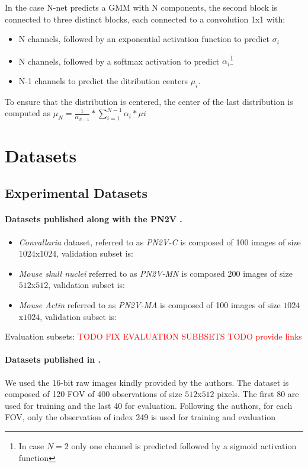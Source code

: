 \documentclass{article}
\begin{document}
In the case N-net predicts a GMM with N components, the second block is connected to three distinct blocks, each connected to a convolution 1x1 with:
\begin{itemize}
  \item N channels, followed by an exponential activation function to predict $\sigma_{i}$
  \item N channels, followed by a softmax activation to predict $\alpha_{i}$\footnote{In case $N=2$ only one channel is predicted followed by a sigmoid activation function}
  \item N-1 channels to predict the ditribution centers $\mu_{i}$.
\end{itemize}
To ensure that the distribution is centered, the center of the last distribution is computed as $\mu_{N} = \frac{1}{\alpha_{N-1}} * \sum_{i=1}^{N-1}{\alpha_{i} * \mu{i}}$

\section{Datasets}
\subsection{Experimental Datasets}
\label{si:datasetxp}
\paragraph{Datasets published along with the PN2V \cite{krull2019probabilistic}.}
\begin{itemize}
  \item \emph{Convallaria} dataset, referred to as \emph{PN2V-C} is composed of 100 images of size $1024$x$1024$, validation subset is:
  \item \emph{Mouse skull nuclei} referred to as \emph{PN2V-MN} is composed 200 images of size $512$x$512$, validation subset is:
  \item \emph{Mouse Actin} referred to as \emph{PN2V-MA} is composed of 100 images of size $1024$x$1024$, validation subset is:
\end{itemize}
Evaluation subsets:
\textcolor{red}{TODO FIX EVALUATION SUBBSETS}
\textcolor{red}{TODO provide links}

\paragraph{Datasets published in \cite{zhou2020w2s}.}
We used the 16-bit raw images kindly provided by the authors.
The dataset is composed of 120 FOV of 400 observations of size $512$x$512$ pixels.
The first 80 are used for training and the last 40 for evaluation.
Following the authors, for each FOV, only the observation of index 249 is used for training and evaluation
\end{document}
